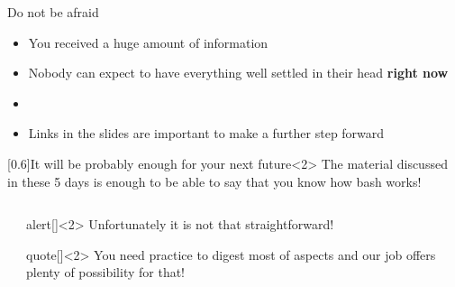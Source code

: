 \begin{frame}{Do not be afraid}
    \vspace{-4mm}
    \begin{itemize}
        \item \alert{You received a huge amount of information}
        \item Nobody can expect to have everything well settled in their head \textbf{right now}
        \item {}
        \item Links in the slides are important to make a further step forward
    \end{itemize}
    \vspace{-2mm}
    \begin{varblock}{}[0.6\textwidth]{It will be probably enough for your next future}<2>
        The material discussed in these 5 days is enough to be able to say that you know how bash works!
    \end{varblock}
    \vspace{5mm}
    \begin{columns}[c]
        \begin{column}{0.3\textwidth}
        \end{column}
        \begin{column}{0.5\textwidth}
            \begin{varblock}{alert}[\textwidth]{}<2>
                \alert{Unfortunately it is not that straightforward!}
            \end{varblock}
            \begin{varblock}{quote}[\textwidth]{}<2>
                \normalfont
                You need practice to digest most of aspects and our job offers plenty of possibility for that!
            \end{varblock}
        \end{column}
    \end{columns}
\end{frame}

